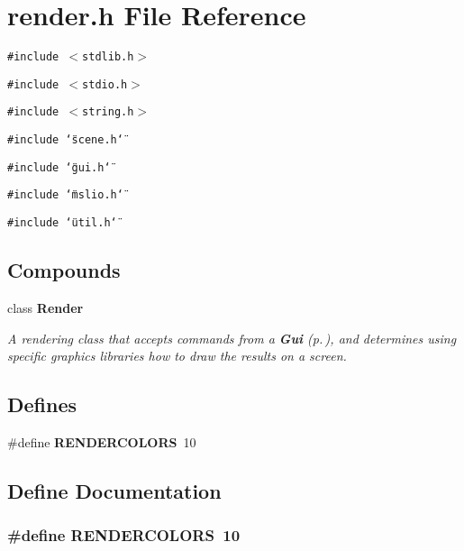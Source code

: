 \section{render.h File Reference}
\label{render_8h}
{\tt \#include $<$stdlib.h$>$}\par
{\tt \#include $<$stdio.h$>$}\par
{\tt \#include $<$string.h$>$}\par
{\tt \#include \char`\"{}scene.h\char`\"{}}\par
{\tt \#include \char`\"{}gui.h\char`\"{}}\par
{\tt \#include \char`\"{}mslio.h\char`\"{}}\par
{\tt \#include \char`\"{}util.h\char`\"{}}\par
\subsection*{Compounds}
\begin{CompactItemize}
\item 
class {\bf Render}
\begin{CompactList}\small\item\em A rendering class that accepts commands from a {\bf Gui} {\rm (p.\,\pageref{classGui})}, and determines using specific graphics libraries how to draw the results on a screen.\item\end{CompactList}\end{CompactItemize}
\subsection*{Defines}
\begin{CompactItemize}
\item 
\#define {\bf RENDERCOLORS}\ 10
\end{CompactItemize}


\subsection{Define Documentation}
\subsubsection{\setlength{\rightskip}{0pt plus 5cm}\#define RENDERCOLORS\ 10}\label{render_8h_a0}


